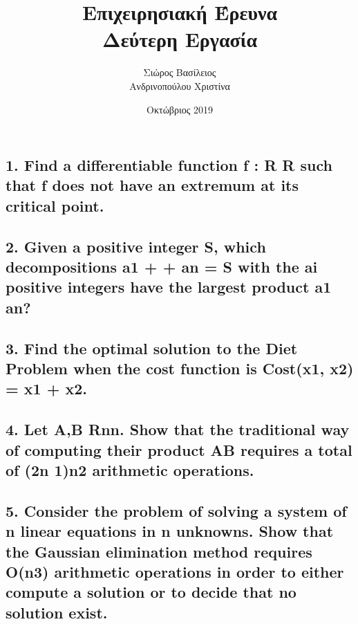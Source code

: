\documentclass[12pt]{article}
\title{\hugeΑλγοριθμική Επιχειρησιακή Έρευνα\\Δεύτερη Εργασία}
\author{Σιώρος Βασίλειος\\Ανδρινοπούλου Χριστίνα}
\date{Οκτώβριος 2019}
\begin{document}
\maketitle

\thispagestyle{empty}




\pagebreak

\subsection*{1. Find a differentiable function f : R R such that f does not have an extremum at its
critical point.}

\vspace{2in}


\pagebreak

\subsection*{2. Given a positive integer S, which decompositions
a1 + + an = S
with the ai positive integers have the largest product a1 an?}

\vspace{2in}


\pagebreak

\subsection*{3. Find the optimal solution to the Diet Problem when the cost function is
Cost(x1, x2) = x1 + x2.}

\vspace{2in}


\pagebreak

\subsection*{4. Let A,B Rnn. Show that the traditional way of computing their product AB requires
a total of (2n 1)n2 arithmetic operations.}

\vspace{2in}


\pagebreak

\subsection*{5. Consider the problem of solving a system of n linear equations in n unknowns. Show
that the Gaussian elimination method requires O(n3) arithmetic operations in order to either
compute a solution or to decide that no solution exist.}
\end{document}
